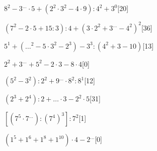 \begin{esercizio} \label{ese:1.17}
\(8^2-3^{\dots}\cdot5+(2^2\cdot3^2-4\cdot9):4^2+3^0\)\hfill[20]
\end{esercizio}
\begin{esercizio} \label{ese:1.17}
\((7^2-2\cdot5+15:3):4+(3\cdot2^2+3^{\dots}-4^2)^2\)\hfill[36]
\end{esercizio}
\begin{esercizio} \label{ese:1.17}
\(5^1+({\dots}^2-5\cdot3^2-2^3)-3^3:(4^2+3-10)\)\hfill[13]
\end{esercizio}
\begin{esercizio} \label{ese:1.17}
\(2^2+3^{\dots}+5^2-2\cdot3-8\cdot4\)\hfill[0]
\end{esercizio}
\begin{esercizio} \label{ese:1.17}
\((5^2-3^2):2^2+9^{\dots}\cdot8^2:8^1\)\hfill[12]
\end{esercizio}
\begin{esercizio} \label{ese:1.17}
\((2^3+2^4):2+{\dots}\cdot3-2^2\cdot5\)\hfill[31]
\end{esercizio}
\begin{esercizio} \label{ese:1.17}
\([(7^5\cdot7^{\dots}):(7^4)^3]:7^2\)\hfill[1]
\end{esercizio}
\begin{esercizio} \label{ese:1.17}
\((1^5+1^6+1^8+1^{10})\cdot4-2^{\dots}\)\hfill[0]
\end{esercizio}
